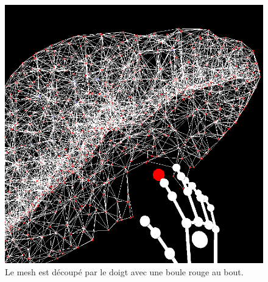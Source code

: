 \documentclass[a4paper,12pt]{article}
\begin{document}
\begin{figure}[ht!]
  \centering
  \includegraphics[width=\textwidth, height=.5\textheight]{images/cut_scalpel.png}
  \caption{Le mesh est découpé par le doigt avec une boule rouge au bout.}
  \label{fig:cut}
\end{figure}
\end{document}
